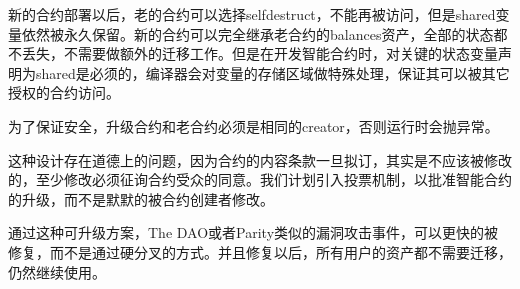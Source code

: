 新的合约部署以后，老的合约可以选择selfdestruct，不能再被访问，但是shared变量依然被永久保留。新的合约可以完全继承老合约的balances资产，全部的状态都不丢失，不需要做额外的迁移工作。但是在开发智能合约时，对关键的状态变量声明为shared是必须的，编译器会对变量的存储区域做特殊处理，保证其可以被其它授权的合约访问。

为了保证安全，升级合约和老合约必须是相同的creator，否则运行时会抛异常。

这种设计存在道德上的问题，因为合约的内容条款一旦拟订，其实是不应该被修改的，至少修改必须征询合约受众的同意。我们计划引入投票机制，以批准智能合约的升级，而不是默默的被合约创建者修改。

通过这种可升级方案，The DAO或者Parity类似的漏洞攻击事件，可以更快的被修复，而不是通过硬分叉的方式。并且修复以后，所有用户的资产都不需要迁移，仍然继续使用。


